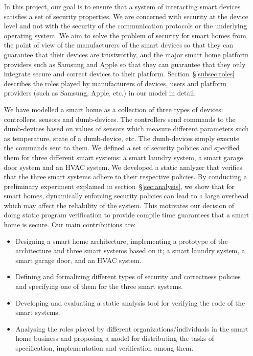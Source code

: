 \documentclass{article}
\begin{document}
In this project, our goal is to ensure that a system of interacting smart devices satisfies a set of security properties. We are concerned with security at the device level and not with the security of the communication protocols or the underlying operating system. We aim to solve the problem of security for smart homes from the point of view of the manufacturers of the smart devices so that they can guarantee that their devices are trustworthy, and the major smart home platform providers such as Samsung and Apple so that they can guarantee that they only integrate secure and correct devices to their platform. Section~\S\ref{subsec:roles} describes the roles played by manufacturers of devices, users and platform providers (such as Samsung, Apple, etc.) in our model in detail.

We have modelled a smart home as a collection of three types of devices: controllers, sensors and dumb-devices. The controllers send commands to the dumb-devices based on values of sensors which measure different parameters such as temperature, state of a dumb-device, etc. The dumb-devices simply execute the commands sent to them.
We defined a set of security policies and specified them for three different smart systems: a smart laundry system, a smart garage door system and an HVAC system. We developed a static analyzer that verifies that the three smart systems adhere to their respective policies. By conducting a preliminary experiment explained in section~\S\ref{sec:analysis}, we show that for smart homes, dynamically enforcing security policies can lead to a large overhead which may affect the reliability of the system. This motivates our decision of doing static program verification to provide compile time guarantees that a smart home is secure. Our main contributions are:
\begin{itemize}[topsep=0pt,itemsep=0ex,partopsep=1ex,parsep=1ex]
    \item Designing a smart home architecture, implementing a prototype of the architecture and three smart systems based on it; a smart laundry system, a smart garage door, and an HVAC system.    
    \item Defining and formalizing different types of security and correctness policies and specifying one of them for the three smart systems.
    \item Developing and evaluating a static analysis tool for verifying the code of the smart systems.
    \item Analysing the roles played by different organizations/individuals in the smart home business and proposing a model for distributing the tasks of specification, implementation and verification among them.
\end{itemize}
  
\end{document}
